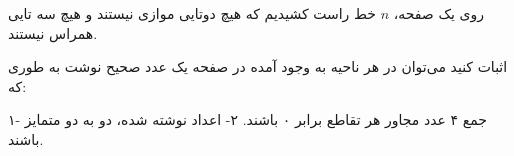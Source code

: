 \begin{PROBLEM}
	\p
	روی یک صفحه، 
	$n$
	خط راست کشیدیم که هیچ دوتایی موازی نیستند و هیچ سه تایی همراس نیستند.

	اثبات کنید می‌توان در هر ناحیه به وجود آمده در صفحه یک عدد صحیح نوشت به طوری که:
	
	۱- جمع ۴ عدد مجاور هر تقاطع برابر ۰ باشند.
	۲- اعداد نوشته شده، دو به دو متمایز باشند.
	\SOLUTION{
		\p

	}
\end{PROBLEM}
